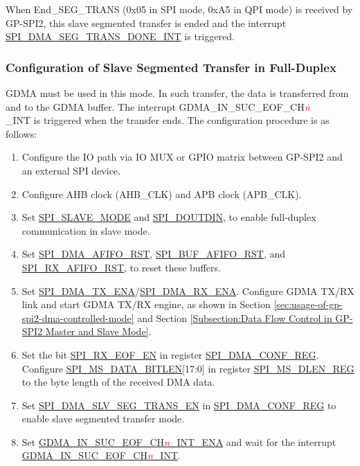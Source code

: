 \documentclass[main\_\_EN.tex]{subfiles}
\begin{document}
When End\_SEG\_TRANS (0x05 in SPI mode, 0xA5 in QPI mode) is received by GP-SPI2, this slave segmented transfer is ended and the interrupt \hyperref[int:SPIDMASEGTRANSDONEINT]{SPI\_DMA\_SEG\_TRANS\_DONE\_INT} is triggered.

\subsubsection{Configuration of Slave Segmented Transfer in Full-Duplex}\label{sec:gp-spi2-slave-fd-seg-trans}
GDMA must be used in this mode. In such transfer, the data is transferred from and to the GDMA buffer. The interrupt GDMA\_IN\_SUC\_EOF\_CH\textcolor{red}{\it{n}}\\\_INT is triggered when the transfer ends. The configuration procedure is as follows:

\begin{enumerate}
   \item Configure the IO path via IO MUX or GPIO matrix between GP-SPI2 and an external SPI device.
   \item Configure AHB clock (AHB\_CLK) and APB clock (APB\_CLK).

    \item Set \hyperref[fielddesc:SPISLAVEMODE]{SPI\_SLAVE\_MODE} and \hyperref[fielddesc:SPIDOUTDIN]{SPI\_DOUTDIN}, to enable full-duplex communication in slave mode.

    \item Set \hyperref[fielddesc:SPIDMAAFIFORST]{SPI\_DMA\_AFIFO\_RST}, \hyperref[fielddesc:SPIBUFAFIFORST]{SPI\_BUF\_AFIFO\_RST}, and \hyperref[fielddesc:SPIRXAFIFORST]{SPI\_RX\_AFIFO\_RST}, to reset these buffers.

    \item Set \hyperref[fielddesc:SPIDMATXENA]{SPI\_DMA\_TX\_ENA}/\hyperref[fielddesc:SPIDMARXENA]{SPI\_DMA\_RX\_ENA}. Configure GDMA TX/RX link and start GDMA TX/RX engine, as shown in Section \ref{sec:usage-of-gp-spi2-dma-controlled-mode} and Section \ref{Subsection:Data Flow Control in GP-SPI2 Master and Slave Mode}.

    \item Set the bit \hyperref[fielddesc:SPIRXEOFEN]{SPI\_RX\_EOF\_EN} in register \hyperref[regdesc:SPIDMACONFREG]{SPI\_DMA\_CONF\_REG}. Configure \hyperref[fielddesc:SPIMSDATABITLEN]{SPI\_MS\_DATA\_BITLEN}[17:0] in register \hyperref[regdesc:SPIMSDLENREG]{SPI\_MS\_DLEN\_REG} to the byte length of the received DMA data.

    \item Set \hyperref[fielddesc:SPIDMASLVSEGTRANSEN]{SPI\_DMA\_SLV\_SEG\_TRANS\_EN} in \hyperref[regdesc:SPIDMACONFREG]{SPI\_DMA\_CONF\_REG} to enable slave segmented transfer mode.

    \item Set \hyperref[fielddesc:GDMAINSUCEOFCH0INTENA]{GDMA\_IN\_SUC\_EOF\_CH\textcolor{red}{\it{n}}\_INT\_ENA} and wait for the interrupt \hyperref[int:GDMAINSUCEOFINT]{GDMA\_IN\_SUC\_EOF\_CH\textcolor{red}{\it{n}}\_INT}.
\end{enumerate}
\end{document}

